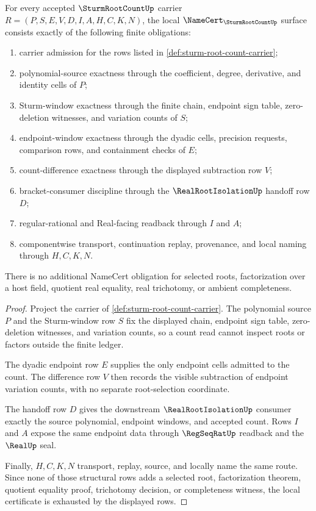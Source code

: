 \begin{theorem}
\label{thm:sturm-root-count-namecert-obligations}
For every accepted $\SturmRootCountUp$ carrier $R=(P,S,E,V,D,I,A,H,C,K,N)$, the local $\NameCert_{\SturmRootCountUp}$ surface consists exactly of the following finite obligations:
\begin{enumerate}
\item carrier admission for the rows listed in \autoref{def:sturm-root-count-carrier};
\item polynomial-source exactness through the coefficient, degree, derivative, and identity cells of $P$;
\item Sturm-window exactness through the finite chain, endpoint sign table, zero-deletion witnesses, and variation counts of $S$;
\item endpoint-window exactness through the dyadic cells, precision requests, comparison rows, and containment checks of $E$;
\item count-difference exactness through the displayed subtraction row $V$;
\item bracket-consumer discipline through the $\RealRootIsolationUp$ handoff row $D$;
\item regular-rational and Real-facing readback through $I$ and $A$;
\item componentwise transport, continuation replay, provenance, and local naming through $H,C,K,N$.
\end{enumerate}
There is no additional NameCert obligation for selected roots, factorization over a host field, quotient real equality, real trichotomy, or ambient completeness.
\end{theorem}
\begin{proof}
Project the carrier of \autoref{def:sturm-root-count-carrier}. The polynomial source $P$ and the Sturm-window row $S$ fix the displayed chain, endpoint sign table, zero-deletion witnesses, and variation counts, so a count read cannot inspect roots or factors outside the finite ledger.

The dyadic endpoint row $E$ supplies the only endpoint cells admitted to the count. The difference row $V$ then records the visible subtraction of endpoint variation counts, with no separate root-selection coordinate.

The handoff row $D$ gives the downstream $\RealRootIsolationUp$ consumer exactly the source polynomial, endpoint windows, and accepted count. Rows $I$ and $A$ expose the same endpoint data through $\RegSeqRatUp$ readback and the $\RealUp$ seal.

Finally, $H,C,K,N$ transport, replay, source, and locally name the same route. Since none of those structural rows adds a selected root, factorization theorem, quotient equality proof, trichotomy decision, or completeness witness, the local certificate is exhausted by the displayed rows.
\end{proof}

